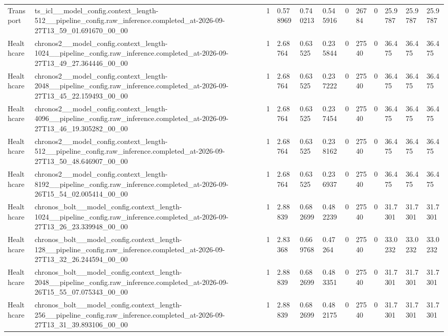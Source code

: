 \begin{tabular}{llllllllllll}
Transport & ts\_icl\_\_model\_config.context\_length-512\_\_pipeline\_config.raw\_inference.completed\_at-2026-09-27T13\_59\_01.691670\_00\_00 & 1 & 0.578969 & 0.740213 & 0.545916 & 0 & 26784 & 0 & 25.9787 & 25.9787 & 25.9787 \\
Healthcare & chronos2\_\_model\_config.context\_length-1024\_\_pipeline\_config.raw\_inference.completed\_at-2026-09-27T13\_49\_27.364446\_00\_00 & 1 & 2.68764 & 0.63525 & 0.235844 & 0 & 27540 & 0 & 36.475 & 36.475 & 36.475 \\
Healthcare & chronos2\_\_model\_config.context\_length-2048\_\_pipeline\_config.raw\_inference.completed\_at-2026-09-27T13\_45\_22.159493\_00\_00 & 1 & 2.68764 & 0.63525 & 0.237222 & 0 & 27540 & 0 & 36.475 & 36.475 & 36.475 \\
Healthcare & chronos2\_\_model\_config.context\_length-4096\_\_pipeline\_config.raw\_inference.completed\_at-2026-09-27T13\_46\_19.305282\_00\_00 & 1 & 2.68764 & 0.63525 & 0.237454 & 0 & 27540 & 0 & 36.475 & 36.475 & 36.475 \\
Healthcare & chronos2\_\_model\_config.context\_length-512\_\_pipeline\_config.raw\_inference.completed\_at-2026-09-27T13\_50\_48.646907\_00\_00 & 1 & 2.68764 & 0.63525 & 0.238162 & 0 & 27540 & 0 & 36.475 & 36.475 & 36.475 \\
Healthcare & chronos2\_\_model\_config.context\_length-8192\_\_pipeline\_config.raw\_inference.completed\_at-2026-09-26T15\_54\_02.005414\_00\_00 & 1 & 2.68764 & 0.63525 & 0.236937 & 0 & 27540 & 0 & 36.475 & 36.475 & 36.475 \\
Healthcare & chronos\_bolt\_\_model\_config.context\_length-1024\_\_pipeline\_config.raw\_inference.completed\_at-2026-09-27T13\_26\_23.339948\_00\_00 & 1 & 2.88839 & 0.682699 & 0.482239 & 0 & 27540 & 0 & 31.7301 & 31.7301 & 31.7301 \\
Healthcare & chronos\_bolt\_\_model\_config.context\_length-128\_\_pipeline\_config.raw\_inference.completed\_at-2026-09-27T13\_32\_26.244594\_00\_00 & 1 & 2.83368 & 0.669768 & 0.47264 & 0 & 27540 & 0 & 33.0232 & 33.0232 & 33.0232 \\
Healthcare & chronos\_bolt\_\_model\_config.context\_length-2048\_\_pipeline\_config.raw\_inference.completed\_at-2026-09-26T15\_55\_07.075343\_00\_00 & 1 & 2.88839 & 0.682699 & 0.483351 & 0 & 27540 & 0 & 31.7301 & 31.7301 & 31.7301 \\
Healthcare & chronos\_bolt\_\_model\_config.context\_length-256\_\_pipeline\_config.raw\_inference.completed\_at-2026-09-27T13\_31\_39.893106\_00\_00 & 1 & 2.88839 & 0.682699 & 0.482175 & 0 & 27540 & 0 & 31.7301 & 31.7301 & 31.7301 \\

\end{tabular}
